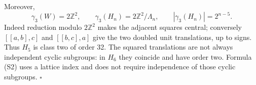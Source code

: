 Moreover,
\[
 \gamma_3(W)=2\mathbb Z^2,
 \qquad \gamma_3(H_n)=2\mathbb Z^2/\Lambda_n,
 \qquad |\gamma_3(H_n)|=2^{n-5}.                         \tag{S2}
\]
Indeed reduction modulo \(2\mathbb Z^2\) makes the adjacent squares
central; conversely \([[a,b],c]\) and \([[b,c],a]\) give the two doubled
unit translations, up to signs. Thus \(H_5\) is class two of order 32.
The squared translations are not always independent cyclic subgroups:
in \(H_6\) they coincide and have order two. Formula (S2) uses a lattice
index and does not require independence of those cyclic subgroups. \(\square\)
